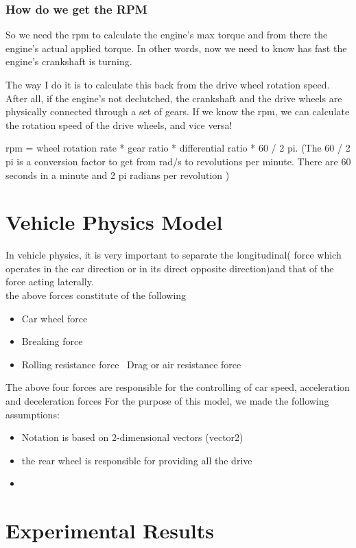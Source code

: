 \documentclass{book}
\begin{document}
\subsubsection{How do we get the RPM}

So we need the rpm to calculate the engine's max torque and from there the engine's actual applied torque. In other words, now we need to know has fast the engine's crankshaft is turning.

The way I do it is to calculate this back from the drive wheel rotation speed.  After all, if the engine's not declutched, the crankshaft and the drive wheels are physically connected through a set of gears. If we know the rpm, we can calculate the rotation speed of the drive wheels, and vice versa!

rpm = wheel rotation rate * gear ratio * differential ratio * 60 / 2 pi. (The 60 / 2 pi is a conversion factor to get from rad/s to revolutions per minute.  There are 60 seconds in a minute and 2 pi radians per revolution )



\section{Vehicle Physics Model}
In vehicle physics, it is very important to separate the longitudinal( force which operates in the car direction or in its direct opposite direction)and that of the force acting laterally.\\
the above forces constitute of the following
\begin{itemize}
    \item Car wheel force
    \item Breaking force
    \item Rolling resistance force
    \ Drag or air resistance force
\end{itemize}
The above four forces are responsible for the controlling of car speed, acceleration and deceleration forces
For the purpose of this model, we made the following assumptions:
\begin{itemize}
    \item Notation is based on 2-dimensional vectors (vector2)
    \item the rear wheel is responsible for providing all the drive
    \item
\end{itemize}



\section{Experimental Results}
\end{document}
